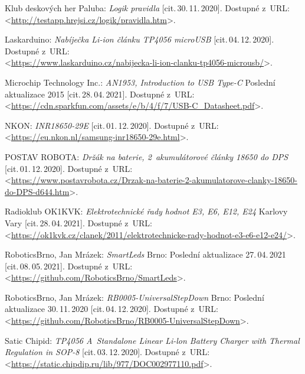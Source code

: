 \begin{thebibliography}{99}
    Klub deskových her Paluba:
    \emph{Logik pravidla}
    [cit.\,30.\,11.\,2020].
    Dostupné z~URL:\\
    <\url{http://testapp.hrejsi.cz/logik/pravidla.htm}>.

    Laskarduino:
    \emph{Nabíječka Li-ion článku TP4056 microUSB}
    [cit.\,04.\,12.\,2020].
    Dostupné z~URL:\\
    <\url{https://www.laskarduino.cz/nabijecka-li-ion-clanku-tp4056-microusb/}>.

    Microchip Technology Inc.:
    \emph{AN1953, Introduction to USB Type-C}
    Poslední aktualizace 2015 [cit.\,28.\,04.\,2021].
    Dostupné z~URL:\\
    <\url{https://cdn.sparkfun.com/assets/e/b/4/f/7/USB-C_Datasheet.pdf}>.

    NKON:
    \emph{INR18650-29E}
    [cit.\,01.\,12.\,2020].
    Dostupné z~URL:\\
    <\url{https://eu.nkon.nl/samsung-inr18650-29e.html}>.

    POSTAV ROBOTA:
    \emph{Držák na baterie, 2~akumulátorové články 18650 do DPS}
    [cit.\,01.\,12.\,2020].
    Dostupné z~URL:\\
    <\url{https://www.postavrobota.cz/Drzak-na-baterie-2-akumulatorove-clanky-18650-do-DPS-d644.htm}>.

    Radioklub OK1KVK:
    \emph{Elektrotechnické řady hodnot E3, E6, E12, E24}
    Karlovy Vary [cit.\,28.\,04.\,2021].
    Dostupné z~URL:\\
    <\url{https://ok1kvk.cz/clanek/2011/elektrotechnicke-rady-hodnot-e3-e6-e12-e24/}>.

    RoboticsBrno, Jan Mrázek:
    \emph{SmartLeds}
    Brno: Poslední aktualizace 27.\,04.\,2021 [cit.\,08.\,05.\,2021].
    Dostupné z~URL:\\
    <\url{https://github.com/RoboticsBrno/SmartLeds}>.

    RoboticsBrno, Jan Mrázek:
    \emph{RB0005-UniversalStepDown}
    Brno: Poslední aktualizace 30.\,11.\,2020 [cit.\,04.\,12.\,2020].
    Dostupné z~URL:\\
    <\url{https://github.com/RoboticsBrno/RB0005-UniversalStepDown}>.

    Satic Chipid:
    \emph{TP4056 A~Standalone Linear Li-lon Battery Charger with Thermal Regulation in SOP-8 }
    [cit.\,03.\,12.\,2020].
    Dostupné z~URL:\\
    <\url{https://static.chipdip.ru/lib/977/DOC002977110.pdf}>.


\end{thebibliography}
